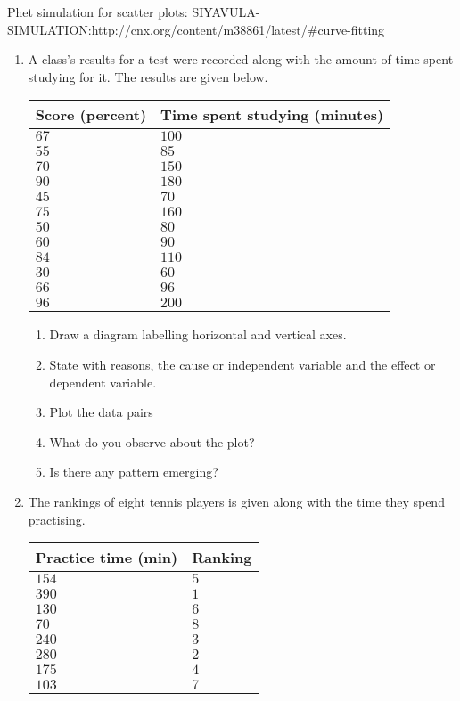 Phet simulation for scatter plots: SIYAVULA-SIMULATION:http://cnx.org/content/m38861/latest/#curve-fitting
{
\begin{enumerate}
\item A class's results for a test were recorded along with the amount of time spent studying for it. The results are given below.
\begin{center}
\begin{tabular}{|l|l|}
\hline
Score (percent) & Time spent studying (minutes)  \\ 
\hline
$67 $&$ 100 $ \\
$55 $& $85 $ \\
$70 $& $150 $ \\
$90 $& $180$  \\
$45 $& $70 $ \\
$75 $& $160 $ \\
$50 $& $80 $ \\
$60 $& $90$  \\
$84 $& $110 $ \\
$30$ & $60 $ \\
$66$ & $96 $ \\
$96$ & $200$  \\
\hline
\end{tabular}
\end{center}

	\begin{enumerate}
	\item Draw a diagram labelling horizontal and vertical axes. 
	\item State with reasons, the cause or independent variable and the effect or dependent variable.
	\item Plot the data pairs
	\item What do you observe about the plot?
	\item Is there any pattern emerging? 
	\end{enumerate}
\item The rankings of eight tennis players is given along with the time they spend practising.

\begin{center}
\begin{tabular}{|l|l|}
\hline
Practice time (min) & Ranking  \\ 
\hline
$154$ & $5$ \\
$390$ & $1$ \\
$130$ & $6$ \\
$70 $ & $8$ \\
$240$ & $3$ \\
$280$ & $2$ \\
$175$ & $4$ \\
$103$ & $7$ \\
\hline
\end{tabular}
\end{center}


\end{enumerate}}
